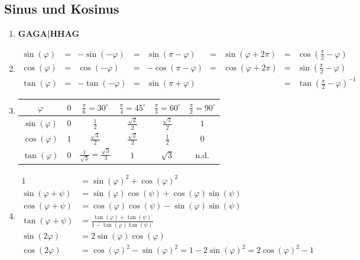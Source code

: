 \documentclass[a4paper,10pt]{article}
\begin{document}
\subsection{Sinus und Kosinus}
\begin{enumerate}
\item \textbf{GAGA|HHAG}
\item
	\begin{align}
	\sin{(\varphi)} &=& -\sin{(-\varphi)} &=& \sin{(\pi - \varphi)}  &=& \sin{(\varphi + 2\pi)} &=& \cos{(\frac{\pi}{2} - \varphi)}\\
	\cos{(\varphi)} &=&  \cos{(-\varphi)} &=& -\cos{(\pi - \varphi)} &=& \cos{(\varphi + 2\pi)} &=& \sin{(\frac{\pi}{2} - \varphi)}\\
	\tan{(\varphi)} &=& -\tan{(-\varphi)} &=& \sin{(\pi + \varphi)}  & &                        &=& \tan{(\frac{\pi}{2} - \varphi)}^{-1}
	\end{align}
\item
	\begin{tabular}{c|ccccc}
	$\varphi$         & $0$ & $\frac{\pi}{6}=30^\circ$ & $\frac{\pi}{4}=45^\circ$ & $\frac{\pi}{3}=60^\circ$ & $\frac{\pi}{2}=90^\circ$ \\ \hline
	$\sin{(\varphi)}$ & $0$ & $\frac{1}{2}$            & $\frac{\sqrt{2}}{2}$     & $\frac{\sqrt{3}}{2}$     & $1$                      \\
	$\cos{(\varphi)}$ & $1$ & $\frac{\sqrt{3}}{2}$     & $\frac{\sqrt{2}}{2}$     & $\frac{1}{2}$            & $0$                      \\
	$\tan{(\varphi)}$ & $0$ & $\frac{1}{\sqrt{3}}=\frac{\sqrt{3}}{3}$   & $1$     & $\sqrt{3}$               & n.d.
	\end{tabular}
\item
	\begin{align}
	1 &= \sin{(\varphi)}^2 + \cos{(\varphi)}^2 \tag{trigonometrischer Pythagoras}\\
	\sin{(\varphi + \psi)} &= \sin{(\varphi)}\cos{(\psi)} + \cos{(\varphi)}\sin{(\psi)} \tag{Addition1}\\
	\cos{(\varphi + \psi)} &= \cos{(\varphi)}\cos{(\psi)} - \sin{(\varphi)}\sin{(\psi)} \tag{Addition2}\\
	\tan{(\varphi + \psi)} &= \frac{\tan{(\varphi)}+\tan{(\psi)}}{1-\tan{(\varphi)}\tan{(\psi)}} \tag{Addition3}\\
	\sin{(2 \varphi)} &= 2 \sin{(\varphi)}\cos{(\varphi)} \tag{Doppelwinkel1}\\
	\cos{(2 \varphi)} &= \cos{(\varphi)}^2 - \sin{(\varphi)}^2 = 1 - 2 \sin{(\varphi)}^2 = 2 \cos{(\varphi)}^2 - 1 \tag{Doppelwinkel2}\\

\end{align}
\end{enumerate}
\end{document}
